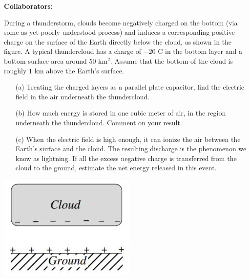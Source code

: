 \documentclass[11pt,letterpaper,boxed]{hmcpset}
\begin{document}
	
	\noindent\textbf{Collaborators:} 
	
	
	\begin{problem} [Problem 1]
		During a thunderstorm, clouds become negatively charged on the bottom (via some as yet poorly understood process) and induces a corresponding positive charge on the surface of the Earth directly below the cloud, as shown in the figure. A typical thundercloud has a charge of $-20$ C in the bottom layer and a bottom surface area around $50$ km$^2$. Assume that the bottom of the cloud is roughly 
		$1$ km above the Earth’s surface.
		\begin{enumerate}
			\item [(a)] Treating the charged layers as a parallel plate capacitor, find the electric field in the air underneath the thundercloud.
			\item [(b)] How much energy is stored in one cubic meter of air, in the region underneath the thundercloud. Comment on your result. 
			\item [(c)]  When the electric field is high enough, it can ionize the air between the Earth’s surface and the cloud. The resulting discharge is the phenomenon we know as lightning. If all the excess negative charge is transferred from the cloud to the ground, estimate the net energy released in this event.
		\end{enumerate}

		\begin{center}
		\includegraphics[scale=.7]{51m6pic.jpg}
		\end{center}
		
	\end{problem}
	
	\begin{solution}
		\vfill
	\end{solution}
	\newpage
	
\end{document}
